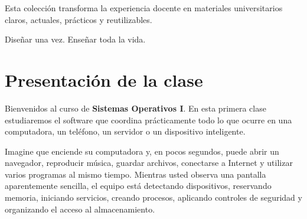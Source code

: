 \documentclass[
  spanish,
  letterpaper,
]{scrbook}
\begin{document}
\begin{tcolorbox}[enhanced jigsaw, arc=.35mm, bottomrule=.15mm, bottomtitle=1mm, breakable, colback=white, colbacktitle=quarto-callout-note-color!10!white, colframe=quarto-callout-note-color-frame, coltitle=black, left=2mm, leftrule=.75mm, opacityback=0, opacitybacktitle=0.6, rightrule=.15mm, title=\textcolor{quarto-callout-note-color}{\faInfo}\hspace{0.5em}{Propósito de la colección}, titlerule=0mm, toprule=.15mm, toptitle=1mm]

Esta colección transforma la experiencia docente en materiales
universitarios claros, actuales, prácticos y reutilizables.

\end{tcolorbox}

\begin{tcolorbox}[enhanced jigsaw, arc=.35mm, bottomrule=.15mm, bottomtitle=1mm, breakable, colback=white, colbacktitle=quarto-callout-tip-color!10!white, colframe=quarto-callout-tip-color-frame, coltitle=black, left=2mm, leftrule=.75mm, opacityback=0, opacitybacktitle=0.6, rightrule=.15mm, title=\textcolor{quarto-callout-tip-color}{\faLightbulb}\hspace{0.5em}{Lema editorial}, titlerule=0mm, toprule=.15mm, toptitle=1mm]

Diseñar una vez. Enseñar toda la vida.

\end{tcolorbox}


\chapter{Presentación de la clase}\label{presentaciuxf3n-de-la-clase}

Bienvenidos al curso de \textbf{Sistemas Operativos I}. En esta primera
clase estudiaremos el software que coordina prácticamente todo lo que
ocurre en una computadora, un teléfono, un servidor o un dispositivo
inteligente.

Imagine que enciende su computadora y, en pocos segundos, puede abrir un
navegador, reproducir música, guardar archivos, conectarse a Internet y
utilizar varios programas al mismo tiempo. Mientras usted observa una
pantalla aparentemente sencilla, el equipo está detectando dispositivos,
reservando memoria, iniciando servicios, creando procesos, aplicando
controles de seguridad y organizando el acceso al almacenamiento.
\end{document}
